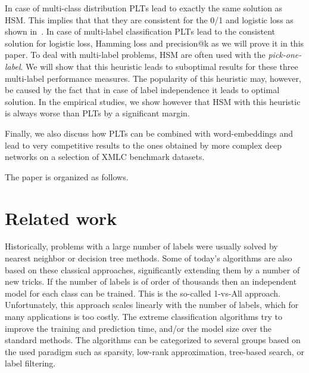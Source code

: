 \documentclass{article}
\newcommand{\Algo}[1]{\textsc{#1}}
\newcommand{\sectionBefore}{-0pt}
\newcommand{\sectionAfter}{-0pt}
\begin{document}
In case of multi-class distribution \Algo{PLT}s lead to exactly the same solution as HSM. This implies that that they are consistent for the 0/1 and logistic loss as shown in~\citep{Dembczynski_et_al_2016}. In case of multi-label classification \Algo{PLT}s  lead to the consistent solution for logistic loss, Hamming loss and precision@k as we will prove it in this paper. To deal with multi-label problems, HSM are often used with the \emph{pick-one-label}. We will show that this heuristic leads to suboptimal results for these three multi-label performance measures. The popularity of this heuristic may, however, be caused by the fact that in case of label independence it leads to optimal solution. In the empirical studies, we show however that HSM with this heuristic is always worse than PLTs by a significant margin. 

Finally, we also discuss how PLTs can be combined with word-embeddings and lead to very competitive results to the ones obtained by more complex deep networks on a selection of XMLC benchmark datasets. 

The paper is organized  as follows.


\vspace{\sectionBefore}
\section{Related work}
\vspace{\sectionAfter}

Historically, problems with a large number of labels were usually solved by nearest neighbor or decision tree methods. Some of today's algorithms are also based on these classical approaches, significantly extending them by a number of new tricks. If the number of labels is of order of thousands then an independent model for each class can be trained. This is the so-called {1-vs-All} approach. Unfortunately, this approach scales linearly with the number of labels, which for many applications is too costly. The extreme classification algorithms try to improve the training and prediction time, and/or the model size over the standard methods. The algorithms can be categorized to several groups based on the used paradigm such as sparsity, low-rank approximation, tree-based search, or label filtering.
\end{document}
